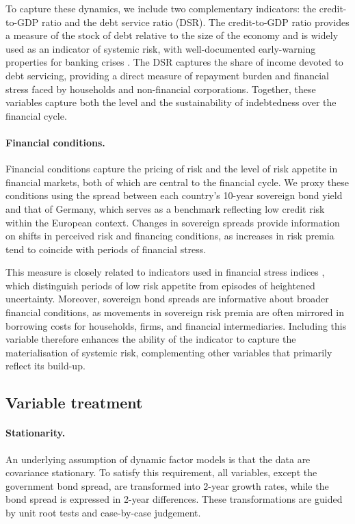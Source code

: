 To capture these dynamics, we include two complementary indicators: the credit-to-GDP ratio and the debt service ratio (DSR). The credit-to-GDP ratio provides a measure of the stock of debt relative to the size of the economy and is widely used as an indicator of systemic risk, with well-documented early-warning properties for banking crises \citep{aikman2015curbing}. The DSR captures the share of income devoted to debt servicing, providing a direct measure of repayment burden and financial stress faced by households and non-financial corporations. Together, these variables capture both the level and the sustainability of indebtedness over the financial cycle.

\paragraph{Financial conditions.}
Financial conditions capture the pricing of risk and the level of risk appetite in financial markets, both of which are central to the financial cycle. We proxy these conditions using the spread between each country's 10-year sovereign bond yield and that of Germany, which serves as a benchmark reflecting low credit risk within the European context. Changes in sovereign spreads provide information on shifts in perceived risk and financing conditions, as increases in risk premia tend to coincide with periods of financial stress.

This measure is closely related to indicators used in financial stress indices \citep{hubrich2015financial}, which distinguish periods of low risk appetite from episodes of heightened uncertainty. Moreover, sovereign bond spreads are informative about broader financial conditions, as movements in sovereign risk premia are often mirrored in borrowing costs for households, firms, and financial intermediaries. Including this variable therefore enhances the ability of the indicator to capture the materialisation of systemic risk, complementing other variables that primarily reflect its build-up.

\subsection{Variable treatment}

\paragraph{Stationarity.}
An underlying assumption of dynamic factor models is that the data are covariance stationary. To satisfy this requirement, all variables, except the government bond spread, are transformed into 2-year growth rates, while the bond spread is expressed in 2-year differences. These transformations are guided by unit root tests and case-by-case judgement.

